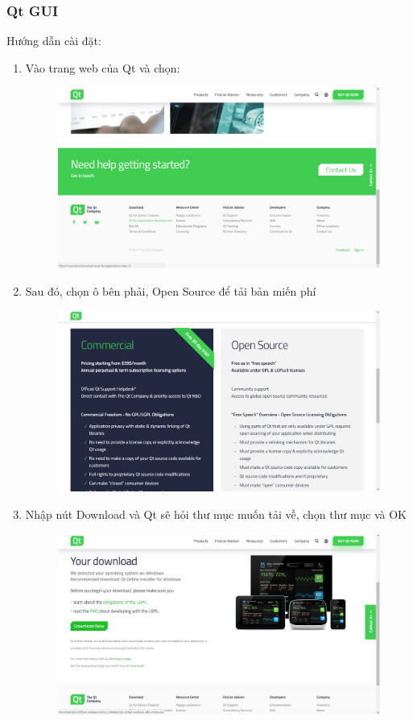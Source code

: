 \documentclass[12pt,a4paper]{report}
\begin{document}
			\subsubsection{Qt GUI}
			Hướng dẫn cài đặt:
			\begin{enumerate}
				\item Vào trang web của Qt và chọn:
				\begin{figure}[H]
					\centering
					\label{F:qtstep0}
					\includegraphics[scale = .3]{Qtstep0.png}
				\end{figure}
				\item Sau đó, chọn ô bên phải, Open Source để tải bản miến phí
				\begin{figure}[H]
					\centering
					\label{F:qtstep1}
					\includegraphics[scale = .3]{Qtstep1.png}
				\end{figure}
				\item Nhập nút Download và Qt sẽ hỏi thư mục muốn tải về, chọn thư mục và OK
				\begin{figure}[H]
					\centering
					\label{F:qtstep2}
					\includegraphics[scale = .3]{Qtstep2.png}

\end{figure}
\end{enumerate}
\end{document}
